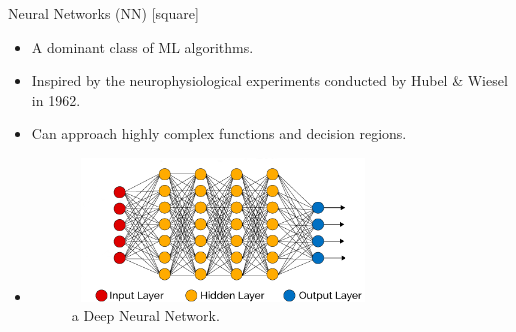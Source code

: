 \begin{frame}{Neural Networks (NN)}
    [square]
    \begin{itemize}
        \item{A dominant class of ML algorithms.}
        \vspace{0.2cm}
        \item{Inspired by the neurophysiological experiments conducted by Hubel \& Wiesel in 1962.}
        \vspace{0.2cm}
        \item{Can approach highly complex functions and decision regions.}
        \vspace{0.5cm}
        \item[]{
        \begin{figure}[H]
            \centering
            \includegraphics[width=8cm,height=3.8cm]{images/dnn.png}
            \caption{a Deep Neural Network.}
            \label{fig:dnn}
        \end{figure}}
    \end{itemize}
\end{frame}

